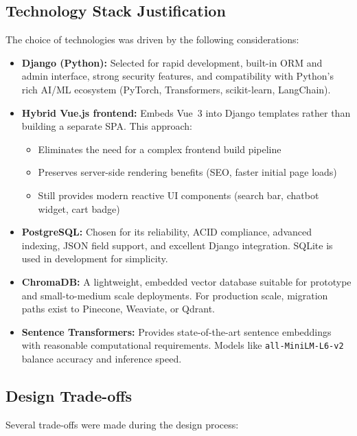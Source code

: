 \subsection*{Technology Stack Justification}
The choice of technologies was driven by the following considerations:

\begin{itemize}
  \item \textbf{Django (Python):} Selected for rapid development, built-in ORM and admin interface, strong security features, and compatibility with Python's rich AI/ML ecosystem (PyTorch, Transformers, scikit-learn, LangChain).
  
  \item \textbf{Hybrid Vue.js frontend:} Embeds Vue~3 into Django templates rather than building a separate SPA. This approach:
  \begin{itemize}
    \item Eliminates the need for a complex frontend build pipeline
    \item Preserves server-side rendering benefits (SEO, faster initial page loads)
    \item Still provides modern reactive UI components (search bar, chatbot widget, cart badge)
  \end{itemize}
  
  \item \textbf{PostgreSQL:} Chosen for its reliability, ACID compliance, advanced indexing, JSON field support, and excellent Django integration. SQLite is used in development for simplicity.
  
  \item \textbf{ChromaDB:} A lightweight, embedded vector database suitable for prototype and small-to-medium scale deployments. For production scale, migration paths exist to Pinecone, Weaviate, or Qdrant.
  
  \item \textbf{Sentence Transformers:} Provides state-of-the-art sentence embeddings with reasonable computational requirements. Models like \texttt{all-MiniLM-L6-v2} balance accuracy and inference speed.
\end{itemize}

\subsection*{Design Trade-offs}
Several trade-offs were made during the design process:

